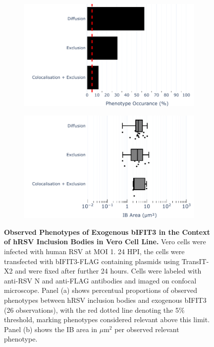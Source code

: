 \begin{figure}
    \begin{subfigure}{0.495\textwidth}
        \caption{}
        \includegraphics[width=1\linewidth]{09. Chapter 4/Figs/02. Overexpression/03. IFIT3/01. bar_i3_hrsv.pdf} 
    \end{subfigure}
    \begin{subfigure}{0.495\textwidth}
        \caption{}
        \includegraphics[width=1\linewidth]{09. Chapter 4/Figs/02. Overexpression/03. IFIT3/02. box_i3_hrsv.pdf}
    \end{subfigure}
    \caption[Observed Phenotypes of Exogenous bIFIT3 in the Context of hRSV Inclusion Bodies in Vero Cell Line.]{\textbf{Observed Phenotypes of Exogenous bIFIT3 in the Context of hRSV Inclusion Bodies in Vero Cell Line.} Vero cells were infected with human RSV at MOI 1. 24 HPI, the cells were transfected with bIFIT3-FLAG containing plasmids using TransIT-X2 and were fixed after further 24 hours. Cells were labeled with anti-RSV N and anti-FLAG antibodies and imaged on confocal microscope. Panel (a) shows percentual proportions of observed phenotypes between hRSV inclusion bodies and exogenous bIFIT3 (26 observations), with the red dotted line denoting the 5\% threshold, marking phenotypes considered relevant above this limit. Panel (b) shows the IB area in \(\mu \mbox{m}^2\) per observed relevant phenotype.}
    \label{fig:Observed Phenotypes of Exogenous bIFIT3 in the Context of hRSV Inclusion Bodies in VERO Cell Line}
\end{figure}

